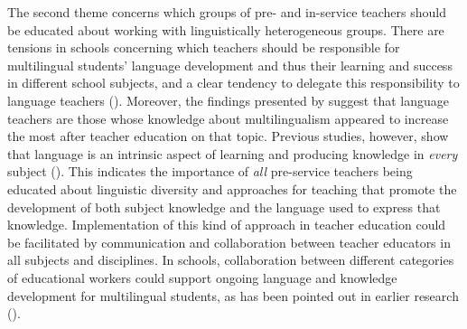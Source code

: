 \documentclass[output=paper]{langscibook}
\begin{document}
\begin{sloppypar}
The second theme concerns which groups of pre- and in-service teachers should be educated about working with linguistically heterogeneous groups. There are tensions in schools concerning which teachers should be responsible for multilingual students’ language development and thus their learning and success in different school subjects, and a clear tendency to delegate this responsibility to language teachers (\citealt{HermanssonEtAl2022}). Moreover, the findings presented by \citet{chapters/8_heikkola} suggest that language teachers are those whose knowledge about multilingualism appeared to increase the most after teacher education on that topic. Previous studies, however, show that language is an intrinsic aspect of learning and producing knowledge in \textit{every} subject (\citealt{Cummins2000,Gibbons2014}). This indicates the importance of \textit{all} pre-service teachers being educated about linguistic diversity and approaches for teaching that promote the development of both subject knowledge and the language used to express that knowledge. Implementation of this kind of approach in teacher education could be facilitated by communication and collaboration between teacher educators in all subjects and disciplines. In schools, collaboration between {d}ifferent categories of educational workers could support ongoing language and knowledge development for multilingual students, as has been pointed out in earlier research (\citealt{Creese2005,Dewilde2013,Warren2017,WedinWessman2017}).
\end{sloppypar}
\end{document}
